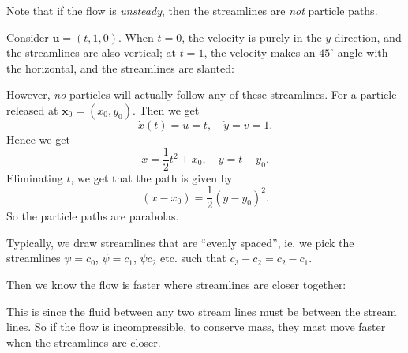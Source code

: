 \documentclass[a4paper]{article}
\begin{document}
Note that if the flow is \emph{unsteady}, then the streamlines are \emph{not} particle paths.
\begin{eg}
  Consider $\mathbf{u} = (t, 1, 0)$. When $t = 0$, the velocity is purely in the $y$ direction, and the streamlines are also vertical; at $t = 1$, the velocity makes an $45^\circ$ angle with the horizontal, and the streamlines are slanted:
  \begin{center}
  \end{center}
  However, \emph{no} particles will actually follow any of these streamlines. For a particle released at $\mathbf{x}_0 = (x_0, y_0)$. Then we get
  \[
    \dot{x}(t) = u = t,\quad \dot{y} = v = 1.
  \]
  Hence we get
  \[
    x = \frac{1}{2}t^2 + x_0,\quad y = t + y_0.
  \]
  Eliminating $t$, we get that the path is given by
  \[
    (x - x_0) = \frac{1}{2}(y - y_0)^2.
  \]
  So the particle paths are parabolas.
\end{eg}
Typically, we draw streamlines that are ``evenly spaced'', ie. we pick the streamlines $\psi = c_0$, $\psi = c_1$, $\psi c_2$ etc. such that $c_3 - c_2 = c_2 - c_1$.

Then we know the flow is faster where streamlines are closer together:
\begin{center}
\end{center}
This is since the fluid between any two stream lines must be between the stream lines. So if the flow is incompressible, to conserve mass, they mast move faster when the streamlines are closer.
\end{document}
